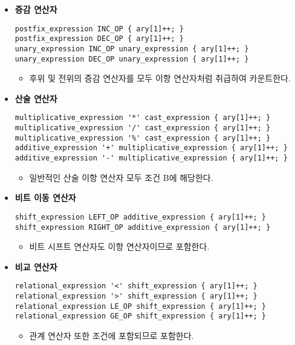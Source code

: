 \documentclass{article}
\begin{document}
\begin{itemize}
  \item \textbf{증감 연산자}
  \begin{lstlisting}
postfix_expression INC_OP { ary[1]++; }
postfix_expression DEC_OP { ary[1]++; }
unary_expression INC_OP unary_expression { ary[1]++; }
unary_expression DEC_OP unary_expression { ary[1]++; }
  \end{lstlisting}
  \begin{itemize}
    \item 후위 및 전위의 증감 연산자를 모두 이항 연산자처럼 취급하여 카운트한다.
  \end{itemize}

  \item \textbf{산술 연산자}
  \begin{lstlisting}
multiplicative_expression '*' cast_expression { ary[1]++; }
multiplicative_expression '/' cast_expression { ary[1]++; }
multiplicative_expression '%' cast_expression { ary[1]++; }
additive_expression '+' multiplicative_expression { ary[1]++; }
additive_expression '-' multiplicative_expression { ary[1]++; }
  \end{lstlisting}
  \begin{itemize}
    \item 일반적인 산술 이항 연산자 모두 조건 B에 해당한다.
  \end{itemize}

  \item \textbf{비트 이동 연산자}
  \begin{lstlisting}
shift_expression LEFT_OP additive_expression { ary[1]++; }
shift_expression RIGHT_OP additive_expression { ary[1]++; }
  \end{lstlisting}
  \begin{itemize}
    \item 비트 시프트 연산자도 이항 연산자이므로 포함한다.
  \end{itemize}

  \item \textbf{비교 연산자}
  \begin{lstlisting}
relational_expression '<' shift_expression { ary[1]++; }
relational_expression '>' shift_expression { ary[1]++; }
relational_expression LE_OP shift_expression { ary[1]++; }
relational_expression GE_OP shift_expression { ary[1]++; }
  \end{lstlisting}
  \begin{itemize}
    \item 관계 연산자 또한 조건에 포함되므로 포함한다.
  \end{itemize}


\end{itemize}
\end{document}
